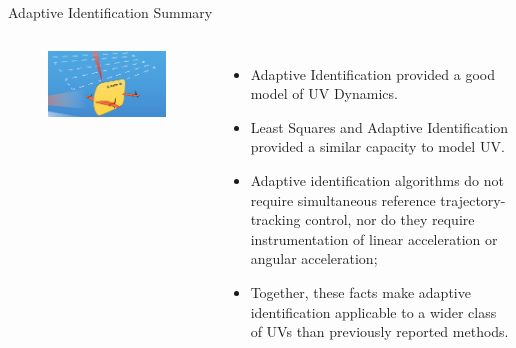   
%    
%   


\begin{frame}{Adaptive Identification Summary}


   \begin{columns}
      \begin{figure}[t!]
        \begin{center}
          \includegraphics[width=\textwidth]{./pres/images/justSentry}
        \end{center}
      \end{figure}
 \begin{itemize}
  \item
    Adaptive Identification provided a good model of UV Dynamics.
  \item Least Squares and Adaptive Identification provided a similar
    capacity to model UV.
  \item Adaptive identification algorithms do not require simultaneous
    reference trajectory-tracking control, nor do they require
    instrumentation of linear acceleration or angular acceleration;
  \item Together, these facts make adaptive identification applicable
    to a wider class of UVs than previously reported methods.
  \end{itemize}
\end{columns}



\end{frame}
